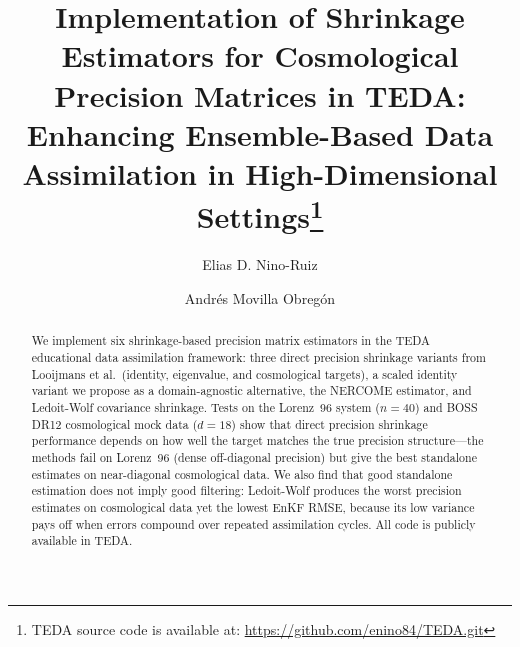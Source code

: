 \documentclass[runningheads]{llncs}
\begin{document}
\title{Implementation of Shrinkage Estimators for Cosmological Precision Matrices in TEDA: Enhancing Ensemble-Based Data Assimilation in High-Dimensional Settings\thanks{TEDA source code is available at: \url{https://github.com/enino84/TEDA.git}}}


\author{Elias D. Nino-Ruiz \and
Andr\'es Movilla Obreg\'on}



\maketitle

\begin{abstract}
We implement six shrinkage-based precision matrix estimators in the TEDA educational data assimilation framework: three direct precision shrinkage variants from Looijmans et al.\ (identity, eigenvalue, and cosmological targets), a scaled identity variant we propose as a domain-agnostic alternative, the NERCOME estimator, and Ledoit-Wolf covariance shrinkage. Tests on the Lorenz~96 system ($n=40$) and BOSS DR12 cosmological mock data ($d=18$) show that direct precision shrinkage performance depends on how well the target matches the true precision structure---the methods fail on Lorenz~96 (dense off-diagonal precision) but give the best standalone estimates on near-diagonal cosmological data. We also find that good standalone estimation does not imply good filtering: Ledoit-Wolf produces the worst precision estimates on cosmological data yet the lowest EnKF RMSE, because its low variance pays off when errors compound over repeated assimilation cycles. All code is publicly available in TEDA.

\end{abstract}










\end{document}
